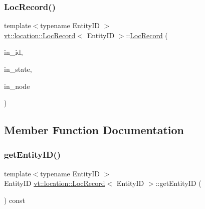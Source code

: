 \subsubsection{\texorpdfstring{Loc\+Record()}{LocRecord()}}
{\footnotesize\ttfamily template$<$typename Entity\+ID $>$ \\
\hyperlink{structvt_1_1location_1_1_loc_record}{vt\+::location\+::\+Loc\+Record}$<$ Entity\+ID $>$\+::\hyperlink{structvt_1_1location_1_1_loc_record}{Loc\+Record} (\begin{DoxyParamCaption}\item[{Entity\+ID const \&}]{in\+\_\+id,  }\item[{\hyperlink{namespacevt_1_1location_a7a5c74aad68cf57281515029d8521547}{Loc\+State\+Type} const \&}]{in\+\_\+state,  }\item[{\hyperlink{namespacevt_a866da9d0efc19c0a1ce79e9e492f47e2}{Node\+Type} const \&}]{in\+\_\+node }\end{DoxyParamCaption})}



\subsection{Member Function Documentation}
\mbox{\label{structvt_1_1location_1_1_loc_record_a710d9bbd99da0c19d1270a06eff6dd6a}} 
\subsubsection{\texorpdfstring{get\+Entity\+I\+D()}{getEntityID()}}
{\footnotesize\ttfamily template$<$typename Entity\+ID $>$ \\
Entity\+ID \hyperlink{structvt_1_1location_1_1_loc_record}{vt\+::location\+::\+Loc\+Record}$<$ Entity\+ID $>$\+::get\+Entity\+ID (\begin{DoxyParamCaption}{ }\end{DoxyParamCaption}) const}

\mbox{\label{structvt_1_1location_1_1_loc_record_ada9c469d3fd01a0eaed1af3a99fc9b2c}} 
